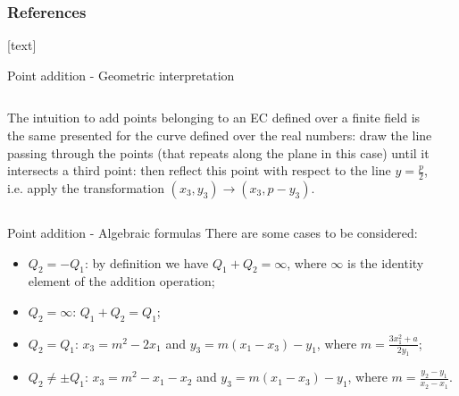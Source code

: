 \documentclass[slidescentered]{beamer}
\newcommand{\backupbegin}{
	\newcounter{framenumberappendix}
	\setcounter{framenumberappendix}{\value{framenumber}}
}
\begin{document}
	\begin{frame}[t, allowframebreaks]
	\frametitle{References}
    	[text]
    	
		\nocite{*}
		
	\end{frame}
	
	\appendix
	\backupbegin
	\begin{frame}[label=point_addition]{Point addition - Geometric interpretation}
		\begin{columns}
			\begin{column}{0.5\linewidth}
				The intuition to add points belonging to an EC defined over a finite field is the same presented for the curve defined over the real numbers: draw the line passing through the points (that repeats along the plane in this case) until it intersects a third point: then reflect this point with respect to the line $y = \frac{p}{2}$, i.e. apply the transformation $(x_3, y_3) \to (x_3, p - y_3)$.
			\end{column}
			\begin{column}{0.6\linewidth}
			\end{column}
		\end{columns}
	\end{frame}

	\begin{frame}{Point addition - Algebraic formulas}
		There are some cases to be considered:
		\begin{itemize}
			\item $Q_2 = -Q_1$: by definition we have $Q_1 + Q_2 = \infty$, where $\infty$ is the identity element of the addition operation;
			\item $Q_2 = \infty$: $Q_1 + Q_2 = Q_1$;
			\item $Q_2 = Q_1$: $x_3 = m^2 - 2x_1$ and $y_3 = m(x_1 - x_3) - y_1$, where $m = \frac{3x_1^2 + a}{2y_1}$;
			\item $Q_2 \neq \pm Q_1$: $x_3 = m^2 - x_1 - x_2$ and $y_3 = m(x_1 - x_3) - y_1$, where $m = \frac{y_2 - y_1}{x_2 - x_1}$.
		\end{itemize}
	\end{frame}
	
\end{document}
